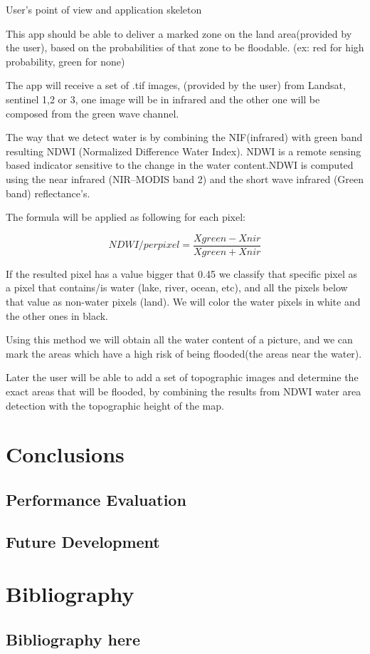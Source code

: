 \documentclass[12pt, a4paper]{report}
\begin{document}
{\Large User's point of view and application skeleton\par}

This app should be able to deliver a marked zone on the land area(provided by the user), based on the probabilities of that zone to be floodable. (ex: red for high probability, green for none)\par 

The app will receive a set of .tif images, (provided by the user) from Landsat, sentinel 1,2 or 3, one image will be in infrared and the other one will be composed from the green wave channel.\par
 The way that we detect water is by combining the NIF(infrared) with green band resulting NDWI (Normalized Difference Water Index). NDWI  is a remote sensing based indicator sensitive to the change in the water content.NDWI  is computed  using  the  near  infrared  (NIR–MODIS  band  2)  and  the  short  wave infrared (Green band) reflectance’s.\par 
The formula will be applied as following for each pixel:

$$ NDWI/perpixel = \frac{Xgreen - Xnir}{Xgreen + Xnir}$$

If the resulted pixel has a value bigger that 0.45 we classify that specific pixel as a pixel that contains/is water (lake, river, ocean, etc), and all the pixels below that value as non-water pixels (land). We will color the water pixels in white and the other ones in black. \par 

Using this method we will obtain all the water content of a picture, and we can mark the areas which have a high risk of being flooded(the areas near the water). \par 

Later the user will be able to add a set of topographic images and determine the exact areas that will be flooded, by combining the results from NDWI water area detection with the topographic height of the map.




\newpage{}

\chapter{Conclusions}


\section{Performance Evaluation} 


\section{Future Development}

\newpage{}

\chapter{Bibliography} 

\section{Bibliography here}

\end{document}
